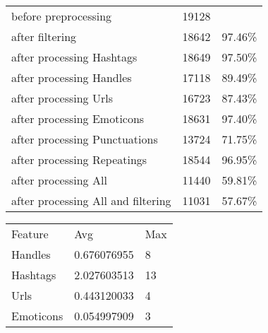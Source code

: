 \begin{tabular}{lll}

before preprocessing & 19128 \\
after filtering & 18642 & 97.46\% \\
after processing Hashtags & 18649 & 97.50\% \\
after processing Handles & 17118 & 89.49\% \\
after processing Urls & 16723 & 87.43\% \\
after processing Emoticons & 18631 & 97.40\% \\
after processing Punctuations & 13724 & 71.75\% \\
after processing Repeatings & 18544 & 96.95\% \\
after processing All & 11440 & 59.81\% \\
after processing All and filtering & 11031 & 57.67\% \\

\end{tabular}

\begin{tabular}{lll}

Feature    & Avg & Max \\
Handles    & 0.676076955 & 8 \\
Hashtags   & 2.027603513 & 13 \\
Urls       & 0.443120033 & 4 \\
Emoticons  & 0.054997909 & 3 \\

\end{tabular}
